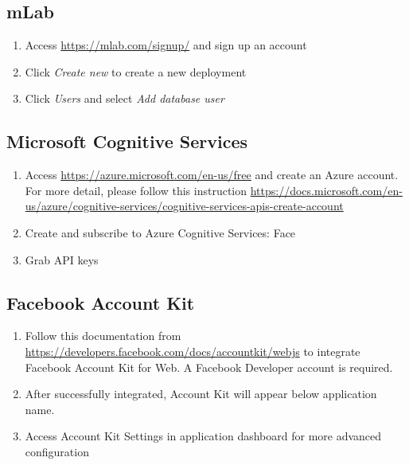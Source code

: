 \tocless\subsection{mLab}
\begin{enumerate}
\item Access \href{https://mlab.com/signup/}{https://mlab.com/signup/} and sign up an account
\item Click \textit{Create new} to create a new deployment
\item Click \textit{Users} and select \textit{Add database user}
\end{enumerate}

\tocless\subsection{Microsoft Cognitive Services}
\begin{enumerate}
\item Access \href{https://azure.microsoft.com/en-us/free}{https://azure.microsoft.com/en-us/free} and create an Azure account. For more detail, please follow this instruction \href{https://docs.microsoft.com/en-us/azure/cognitive-services/cognitive-services-apis-create-account}{https://docs.microsoft.com/en-us/azure/cognitive-services/cognitive-services-apis-create-account}
\item Create and subscribe to  Azure Cognitive Services: Face
\item Grab API keys
\end{enumerate}

\tocless\subsection{Facebook Account Kit}
\begin{enumerate}
\item Follow this documentation from \href{https://developers.facebook.com/docs/accountkit/webjs}{https://developers.facebook.com/docs/accountkit/webjs} to integrate Facebook Account Kit for Web. A Facebook Developer account is required.
\item After successfully integrated, Account Kit will appear below application name.
\item Access Account Kit Settings in application dashboard for more advanced configuration
\end{enumerate}

